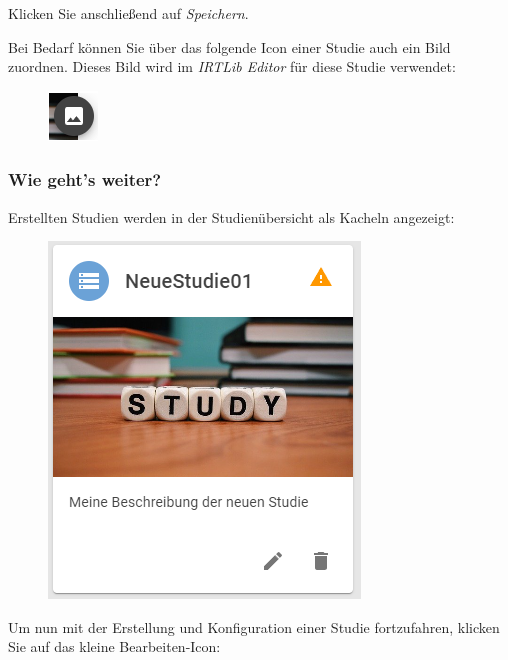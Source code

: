 \documentclass[
  letterpaper,
  DIV=11]{scrreprt}
\begin{document}
\begin{tcolorbox}
\begin{figure}[H]
\end{figure}

Klicken Sie anschließend auf \emph{Speichern}.

Bei Bedarf können Sie über das folgende Icon einer Studie auch ein Bild
zuordnen. Dieses Bild wird im \emph{IRTLib Editor} für diese Studie
verwendet:

\begin{figure}[H]

\includegraphics{img/icon-study-image.png} \hfill{}

\end{figure}

\hypertarget{wie-gehts-weiter-1}{%
\subsubsection{Wie geht's weiter?}\label{wie-gehts-weiter-1}}

Erstellten Studien werden in der Studienübersicht als Kacheln angezeigt:

\begin{figure}[H]

\includegraphics{img/screenshot-new-study-card.DEU.png} \hfill{}

\end{figure}

Um nun mit der Erstellung und Konfiguration einer Studie fortzufahren,
klicken Sie auf das kleine Bearbeiten-Icon:


\end{tcolorbox}
\end{document}
